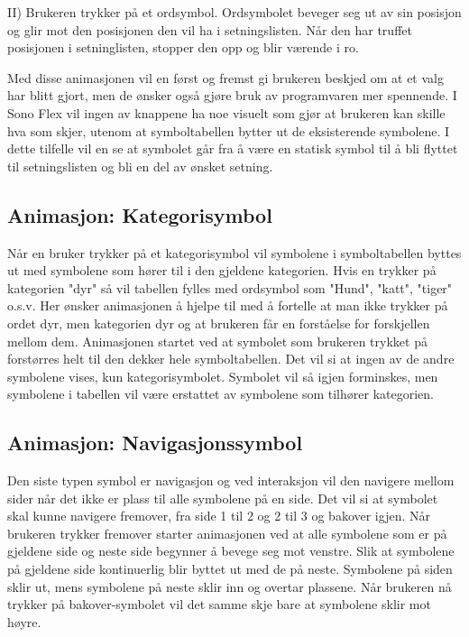 II) Brukeren trykker på et ordsymbol. 
    Ordsymbolet beveger seg ut av sin posisjon og glir mot den posisjonen den vil ha i setningslisten. 
    Når den har truffet posisjonen i setninglisten, stopper den opp og blir værende i ro. 
 
 
    Med disse animasjonen vil en først og fremst gi brukeren beskjed om at et valg har blitt gjort, men de ønsker også gjøre bruk av programvaren mer spennende.  I Sono Flex  vil ingen av knappene ha noe visuelt som gjør at brukeren kan skille hva som skjer, utenom at symboltabellen bytter ut de eksisterende symbolene. I dette tilfelle vil en se at symbolet går fra å være en statisk symbol til å bli flyttet til setningslisten og bli en del av ønsket setning.  
 
 
 
 
 
 
\subsection{Animasjon: Kategorisymbol} 
 
 
Når en bruker trykker på et kategorisymbol vil symbolene i symboltabellen byttes ut med symbolene som hører til i den gjeldene kategorien. Hvis en trykker på kategorien "dyr" så vil tabellen fylles med ordsymbol som "Hund", "katt", "tiger" o.s.v. Her ønsker animasjonen å hjelpe til med å fortelle at man ikke trykker på ordet dyr, men kategorien dyr og at brukeren får en forståelse for forskjellen mellom dem. Animasjonen startet ved at symbolet som brukeren trykket på forstørres helt til den dekker hele symboltabellen. Det vil si at ingen av de andre symbolene vises, kun kategorisymbolet. Symbolet vil så igjen forminskes, men symbolene i tabellen vil være erstattet av symbolene som tilhører kategorien.  
 
 
 
 
\subsection{Animasjon: Navigasjonssymbol} 
 
 
Den siste typen symbol er navigasjon og ved interaksjon vil den navigere mellom sider når det ikke er plass til alle symbolene på en side. Det vil si at symbolet skal kunne navigere fremover, fra side 1 til 2 og 2 til 3 og bakover igjen. Når brukeren trykker fremover starter animasjonen ved at alle symbolene som er på gjeldene side og neste side begynner å bevege seg mot venstre. Slik at symbolene på gjeldene side kontinuerlig blir byttet ut med de på neste. Symbolene på siden sklir ut, mens symbolene på neste sklir inn og overtar plassene. Når brukeren nå trykker på bakover-symbolet vil det samme skje bare at symbolene sklir mot høyre. 
 
